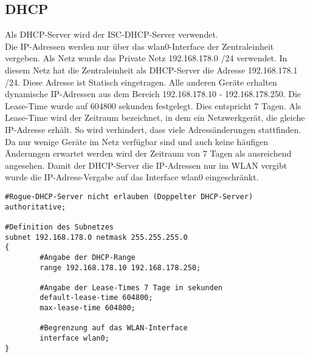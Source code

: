 \subsection{\ac{DHCP}}
 
Als \ac{DHCP}-Server wird der ISC-DHCP-Server verwendet.\\
Die IP-Adressen werden nur über das wlan0-Interface der Zentraleinheit vergeben. Als Netz wurde das Private Netz 192.168.178.0 /24 verwendet. In diesem Netz hat die Zentraleinheit als \ac{DHCP}-Server die Adresse 192.168.178.1 /24. Diese Adresse ist Statisch eingetragen. Alle anderen Geräte erhalten dynamische IP-Adressen aus dem Bereich 192.168.178.10 - 192.168.178.250. Die Lease-Time wurde auf 604800 sekunden festgelegt. Dies entspricht 7 Tagen. Als Lease-Time wird der Zeitraum bezeichnet, in dem ein Netzwerkgerät, die gleiche IP-Adresse erhält. So wird verhindert, dass viele Adressänderungen stattfinden. Da nur wenige Geräte im Netz verfügbar sind und auch keine häufigen Änderungen erwartet werden wird der Zeitraum von 7 Tagen als ausreichend angesehen. Damit der \ac{DHCP}-Server die IP-Adressen nur im WLAN vergibt wurde die IP-Adress-Vergabe auf das Interface wlan0 eingeschränkt.



\begin{lstlisting}[caption=Konfiguration des ISC-DHCP-Server,frame=single]
#Rogue-DHCP-Server nicht erlauben (Doppelter DHCP-Server)
authoritative;

#Definition des Subnetzes
subnet 192.168.178.0 netmask 255.255.255.0
{
        #Angabe der DHCP-Range
        range 192.168.178.10 192.168.178.250;

        #Angabe der Lease-Times 7 Tage in sekunden
        default-lease-time 604800;
        max-lease-time 604800;

        #Begrenzung auf das WLAN-Interface
        interface wlan0;
}

\end{lstlisting}

